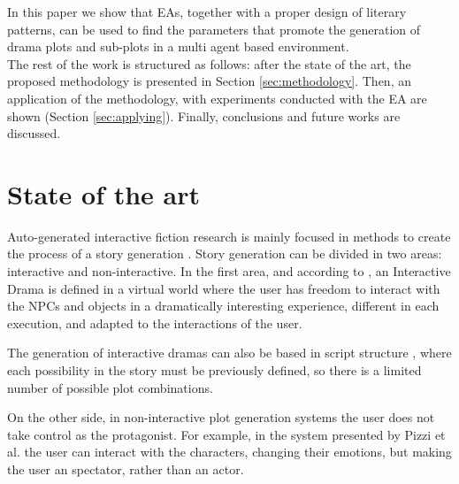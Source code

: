 \documentclass{sig-alternate}
\begin{document}
In this paper we show that EAs, together with a proper design of
literary patterns, can be used to find the parameters that promote the
generation of drama plots and sub-plots in a multi agent based
environment.\\


The rest of the work is structured as follows: after the state of the art, the proposed methodology is presented in Section \ref{sec:methodology}. Then, an application of the methodology, with experiments conducted with the EA are shown (Section \ref{sec:applying}). Finally, conclusions and future works are discussed.


%
%


\section{State of the art}
\label{sec:soa}


Auto-generated interactive fiction research is mainly focused in
methods to create the process of a story generation
\cite{nairat2011character}. Story generation can be divided in two
areas: interactive and non-interactive. In the first area, and
according to \cite{ReviewArinbjarnar09}, an Interactive Drama is
defined in a virtual world where the user has freedom to interact with
the NPCs and objects in a dramatically interesting experience,
different in each execution, and adapted to the interactions of the
user. %

The generation of interactive dramas can also be based in script
structure \cite{ArchitectureYoung04}, where each possibility in the
story must be previously defined, so there is a limited number of
possible plot combinations.

On the other side, in non-interactive plot generation systems the user
does not take control as the protagonist. For example, in the system
presented by Pizzi et al. \cite{pizzi2007interactive} the user can
interact with the characters, changing their emotions, but making the
user an spectator, rather than an actor. %
\end{document}
